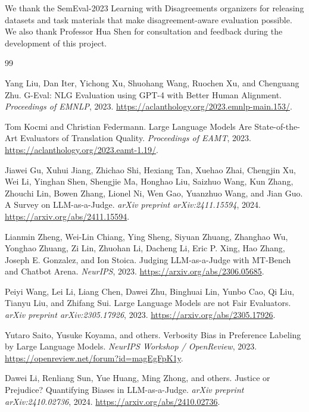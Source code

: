 \documentclass[11pt]{article}
\begin{document}
We thank the SemEval-2023 Learning with Disagreements organizers for releasing datasets and task materials that make disagreement-aware evaluation possible. We also thank Professor Hua Shen for consultation and feedback during the development of this project.


\begin{thebibliography}{99}

Yang Liu, Dan Iter, Yichong Xu, Shuohang Wang, Ruochen Xu, and Chenguang Zhu.
\newblock G-Eval: NLG Evaluation using GPT-4 with Better Human Alignment.
\newblock \emph{Proceedings of EMNLP}, 2023.
\newblock \url{https://aclanthology.org/2023.emnlp-main.153/}.

Tom Kocmi and Christian Federmann.
\newblock Large Language Models Are State-of-the-Art Evaluators of Translation Quality.
\newblock \emph{Proceedings of EAMT}, 2023.
\newblock \url{https://aclanthology.org/2023.eamt-1.19/}.

Jiawei Gu, Xuhui Jiang, Zhichao Shi, Hexiang Tan, Xuehao Zhai, Chengjin Xu, Wei Li, Yinghan Shen, Shengjie Ma, Honghao Liu, Saizhuo Wang, Kun Zhang, Zhouchi Lin, Bowen Zhang, Lionel Ni, Wen Gao, Yuanzhuo Wang, and Jian Guo.
\newblock A Survey on LLM-as-a-Judge.
\newblock \emph{arXiv preprint arXiv:2411.15594}, 2024.
\newblock \url{https://arxiv.org/abs/2411.15594}.

Lianmin Zheng, Wei-Lin Chiang, Ying Sheng, Siyuan Zhuang, Zhanghao Wu, Yonghao Zhuang, Zi Lin, Zhuohan Li, Dacheng Li, Eric P. Xing, Hao Zhang, Joseph E. Gonzalez, and Ion Stoica.
\newblock Judging LLM-as-a-Judge with MT-Bench and Chatbot Arena.
\newblock \emph{NeurIPS}, 2023.
\newblock \url{https://arxiv.org/abs/2306.05685}.

Peiyi Wang, Lei Li, Liang Chen, Dawei Zhu, Binghuai Lin, Yunbo Cao, Qi Liu, Tianyu Liu, and Zhifang Sui.
\newblock Large Language Models are not Fair Evaluators.
\newblock \emph{arXiv preprint arXiv:2305.17926}, 2023.
\newblock \url{https://arxiv.org/abs/2305.17926}.

Yutaro Saito, Yusuke Koyama, and others.
\newblock Verbosity Bias in Preference Labeling by Large Language Models.
\newblock \emph{NeurIPS Workshop / OpenReview}, 2023.
\newblock \url{https://openreview.net/forum?id=magEgFpK1y}.

Dawei Li, Renliang Sun, Yue Huang, Ming Zhong, and others.
\newblock Justice or Prejudice? Quantifying Biases in LLM-as-a-Judge.
\newblock \emph{arXiv preprint arXiv:2410.02736}, 2024.
\newblock \url{https://arxiv.org/abs/2410.02736}.


\end{thebibliography}
\end{document}
